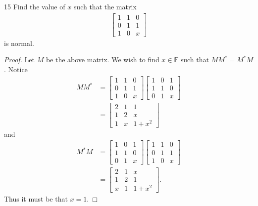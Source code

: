 \documentclass{extarticle}
\newenvironment{problem}[1]{\begin{prob*}{#1}{}}{\end{prob*}}
\newcommand{\F}{\mathbb{F}}
\begin{document}
\begin{problem}{15}
Find the value of $x$ such that the matrix
\begin{align*}
\begin{bmatrix}
1 & 1 & 0 \\
0 & 1 & 1 \\
1 & 0 & x 
\end{bmatrix}
\end{align*}
is normal.
\end{problem}
\begin{proof}
Let $M$ be the above matrix.  We wish to find $x\in \F$ such that $MM^\ast = M^\ast M$.  Notice
\begin{align*}
MM^\ast &= \begin{bmatrix}
1 & 1 & 0 \\
0 & 1 & 1 \\
1 & 0 & x 
\end{bmatrix}
\begin{bmatrix}
1 & 0 & 1 \\
1 & 1 & 0 \\
0 & 1 & x 
\end{bmatrix}\\
&= 
\begin{bmatrix}
2 & 1 & 1 \\
1 & 2 & x \\
1 & x & 1 + x^2 
\end{bmatrix}
\end{align*}
and
\begin{align*}
M^\ast M &= 
\begin{bmatrix}
1 & 0 & 1 \\
1 & 1 & 0 \\
0 & 1 & x 
\end{bmatrix}
\begin{bmatrix}
1 & 1 & 0 \\
0 & 1 & 1 \\
1 & 0 & x 
\end{bmatrix}\\
&= 
\begin{bmatrix}
2 & 1 & x \\
1 & 2 & 1 \\
x & 1 & 1 + x^2 
\end{bmatrix}.
\end{align*}
Thus it must be that $x = 1$.
\end{proof}


\end{document}

